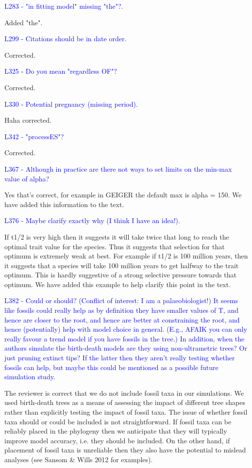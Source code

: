 \documentclass[12pt]{letter}
\begin{document}
\begin{letter}{}
\textcolor{blue}{L283 - "in fitting model" missing "the"?.}

Added "the".

\textcolor{blue}{L299 - Citations should be in date order.}

Corrected.

\textcolor{blue}{L325 - Do you mean "regardless OF"?}

Corrected.

\textcolor{blue}{L330 - Potential pregnancy (missing period).}

Haha corrected.

\textcolor{blue}{L342 - "processES"?}

Corrected.

\textcolor{blue}{L367 - Although in practice are there not ways to set limits on the min-max value of alpha?}

Yes that's correct, for example in GEIGER the default max is alpha = 150. We have added this information to the text. 

\textcolor{blue}{L376 - Maybe clarify exactly why (I think I have an idea!).}

If t1/2 is very high then it suggests it will take twice that long to reach the optimal trait value for the species. Thus it suggests that selection for that optimum is extremely weak at best. For example if t1/2 is 100 million years, then it suggests that a species will take 100 million years to get halfway to the trait optimum. This is hardly suggestive of a strong selective pressure towards that optimum. We have added this example to help clarify this point in the text.

\textcolor{blue}{L382 - Could or should? (Conflict of interest: I am a palaeobiologist!) It seems like fossils could really help as by definition they have smaller values of T, and hence are closer to the root, and hence are better at constraining the root, and hence (potentially) help with model choice in general. (E.g., AFAIK you can only really favour a trend model if you have fossils in the tree.) In addition, when the authors simulate the birth-death models are they using non-ultrametric trees? Or just pruning extinct tips? If the latter then they aren't really testing whether fossils can help, but maybe this could be mentioned as a possible future simulation study.}

The reviewer is correct that we do not include fossil taxa in our simulations. We used birth-death trees as a means of assessing the impact of different tree shapes rather than explicitly testing the impact of fossil taxa. The issue of whether fossil taxa should or could be included is not straightforward. If fossil taxa can be reliably placed in the phylogeny then we anticipate that they will typically improve model accuracy, i.e. they should be included. On the other hand, if placement of fossil taxa is unreliable then they also have the potential to mislead analyses (see Sansom \& Wills 2012 for examples).


\end{letter}
\end{document}
